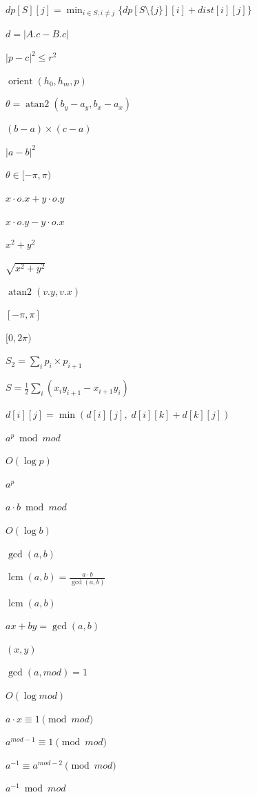 \documentclass{article}
\begin{document}
$dp[S][j] = \min_{i \in S, i \neq j}\{dp[S \setminus \{j\}][i] + dist[i][j]\}$
\pagebreak

$d = |A.c - B.c|$
\pagebreak

$|p - c|^2 \le r^2$
\pagebreak

$\operatorname{orient}(h_0, h_m, p)$
\pagebreak

$\theta = \operatorname{atan2}(b_y-a_y, b_x-a_x)$
\pagebreak

$(b-a) \times (c-a)$
\pagebreak

$|a - b|^2$
\pagebreak

$\theta \in [-\pi, \pi)$
\pagebreak

$x \cdot o.x + y \cdot o.y$
\pagebreak

$x \cdot o.y - y \cdot o.x$
\pagebreak

$x^2 + y^2$
\pagebreak

$\sqrt{x^2 + y^2}$
\pagebreak

$\operatorname{atan2}(v.y, v.x)$
\pagebreak

$[-\pi, \pi]$
\pagebreak

$[0, 2\pi)$
\pagebreak

$S_2 = \sum_{i} p_i \times p_{i+1}$
\pagebreak

$S = \frac{1}{2}\sum_{i}(x_i y_{i+1} - x_{i+1} y_i)$
\pagebreak

$d[i][j] = \min(d[i][j],\; d[i][k]+d[k][j])$
\pagebreak

$a^p \bmod mod$
\pagebreak

$O(\log p)$
\pagebreak

$a^p$
\pagebreak

$a \cdot b \bmod mod$
\pagebreak

$O(\log b)$
\pagebreak

$\gcd(a, b)$
\pagebreak

$\operatorname{lcm}(a, b) = \frac{a \cdot b}{\gcd(a, b)}$
\pagebreak

$\operatorname{lcm}(a, b)$
\pagebreak

$ax + by = \gcd(a, b)$
\pagebreak

$(x, y)$
\pagebreak

$\gcd(a, mod) = 1$
\pagebreak

$O(\log mod)$
\pagebreak

$a \cdot x \equiv 1 \pmod{mod}$
\pagebreak

$a^{mod-1} \equiv 1 \pmod{mod}$
\pagebreak

$a^{-1} \equiv a^{mod-2} \pmod{mod}$
\pagebreak

$a^{-1} \bmod mod$
\pagebreak
\end{document}

